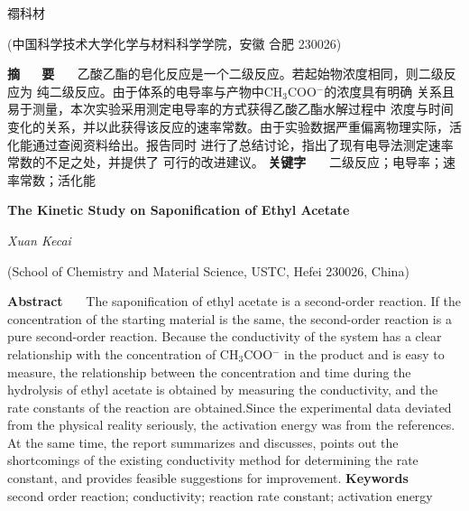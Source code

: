 \documentclass[12pt]{ctexart}
\numberwithin{equation}{section}
\begin{document}
\nocite{*}

\begin{center}
    \heiti {}

    \vspace{12pt}

    \kaishu \fontsize{13.75pt}{0}禤科材


    \vspace{5pt}

    \songti \fontsize{12pt}{0}(中国科学技术大学化学与材料科学学院，安徽 合肥 230026)
\end{center}

\noindent\textbf{摘~~~\!要}~~~\!
乙酸乙酯的皂化反应是一个二级反应。若起始物浓度相同，则二级反应为
纯二级反应。由于体系的电导率与产物中CH$_3$COO$^−$的浓度具有明确
关系且易于测量，本次实验采用测定电导率的方式获得乙酸乙酯水解过程中
浓度与时间变化的关系，并以此获得该反应的速率常数。由于实验数据严重偏离物理实际，活化能通过查阅资料给出。报告同时
进行了总结讨论，指出了现有电导法测定速率常数的不足之处，并提供了
可行的改进建议。
\newline
\textbf{关键字}~~~\!
二级反应；电导率；速率常数；活化能

\begin{center}
    {\LARGE\rmfamily\textbf{The Kinetic Study on Saponification of Ethyl Acetate}}

    \vspace{12pt}

    {\slshape Xuan Kecai}

    \vspace{5pt}

    (School of Chemistry and Material Science, USTC, Hefei 230026, China)
\end{center}

\noindent\textbf{Abstract}~~~\!
The saponification of ethyl acetate is a second-order
reaction. If the concentration of the starting material is
the same, the second-order reaction is a pure second-order
reaction. Because the conductivity of the system has a clear
relationship with the concentration of CH$_3$COO$^−$ in the
product and is easy to measure, the relationship between the
concentration and time during the hydrolysis of ethyl
acetate is obtained by measuring the conductivity, and the
rate constants of the reaction are
obtained.Since the experimental data deviated from the physical reality seriously, the activation energy was from the references. At the same time, the report summarizes and
discusses, points out the shortcomings of the existing
conductivity method for determining the rate constant, and
provides feasible suggestions for improvement.
\newline
\textbf{Keywords}~~~\!
second order reaction; conductivity; reaction rate constant;
activation energy
\end{document}
